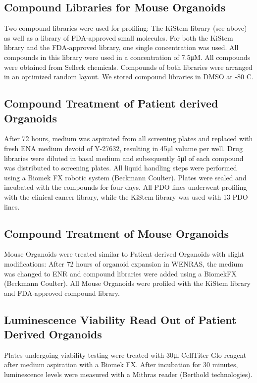 \begin{flushleft}
\subsection{Compound Libraries for Mouse Organoids}
Two compound libraries were used for profiling: The KiStem library (see above) as well as a library of FDA-approved small molecules. For both the KiStem library and the FDA-approved library, one single concentration was used. All compounds in this library were used in a concentration of 7.5μM. All compounds were obtained from Selleck chemicals. Compounds of both libraries were arranged in an optimized random layout. We stored compound libraries in DMSO at -80 C.

\subsection{Compound Treatment of Patient derived Organoids}
After 72 hours, medium was aspirated from all screening plates and replaced with fresh ENA medium devoid of Y-27632, resulting in 45μl volume per well. Drug libraries were diluted in basal medium and subsequently 5μl of each compound was distributed to screening plates. 
All liquid handling steps were performed using a Biomek FX robotic system (Beckmann Coulter). Plates were sealed and incubated with the compounds for four days. All PDO lines underwent profiling with the clinical cancer library, while the KiStem library was used with 13 PDO lines.

\subsection{Compound Treatment of Mouse Organoids}
Mouse Organoids were treated similar to Patient derived Organoids with slight modifications: After 72 hours of organoid expansion in WENRAS, the medium was changed to ENR and compound libraries were added using a BiomekFX (Beckmann Coulter). All Mouse Organoids were profiled with the KiStem library and FDA-approved compound library.

\subsection{Luminescence Viability Read Out of Patient Derived Organoids}
Plates undergoing viability testing were treated with 30μl CellTiter-Glo reagent after medium aspiration with a Biomek FX. After incubation for 30 minutes, luminescence levels were measured with a Mithras reader (Berthold technologies).


\end{flushleft}
